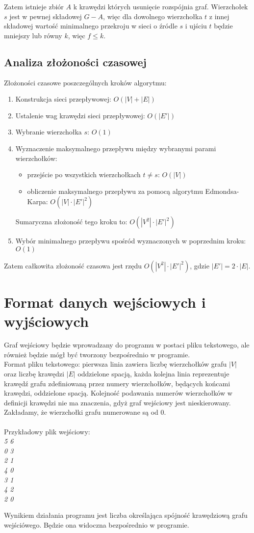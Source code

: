 \documentclass{article}
\begin{document}
Zatem istnieje zbiór $A$ k krawędzi których usunięcie rozspójnia graf. Wierzchołek $s$ jest w pewnej składowej $G-A$, więc dla dowolnego wierzchołka $t$ z innej składowej wartość minimalnego przekroju w sieci o źródle $s$ i ujściu $t$ będzie mniejszy lub równy $k$, więc $f \le k$.


\subsection{Analiza złożoności czasowej}


Złożoności czasowe poszczególnych kroków algorytmu: 
\begin{enumerate}
\item Konstrukcja sieci przepływowej: $O(|V|+|E|)$
\item Ustalenie wag krawędzi sieci przepływowej: $O(|E'|)$
\item Wybranie wierzchołka $s$: $O(1)$
\item Wyznaczenie maksymalnego przepływu między wybranymi parami wierzchołków: 
\begin{itemize}
    \item przejście po wszystkich wierzchołkach $t \neq s$: $O(|V|)$
    \item obliczenie maksymalnego przepływu za pomocą algorytmu Edmondsa-Karpa: $O(|V|\cdot|E'|^{2})$
\end{itemize}
Sumaryczna złożoność tego kroku to: $O(|V^{2}|\cdot|E'|^{2})$
\item Wybór minimalnego przepływu spośród wyznaczonych w poprzednim kroku: $O(1)$
\end{enumerate}
Zatem całkowita złożoność czasowa jest rzędu $O(|V^{2}|\cdot|E'|^{2})$, gdzie $|E'|=2\cdot |E|$.\\


\section{Format danych wejściowych i wyjściowych}
Graf wejściowy będzie wprowadzany do programu w postaci pliku tekstowego, ale również będzie mógł być tworzony bezpośrednio w programie.\\

Format pliku tekstowego: pierwsza linia zawiera liczbę wierzchołków grafu $|V|$ oraz liczbę krawędzi $|E|$ oddzielone spacją, każda kolejna linia reprezentuje krawędź grafu zdefiniowaną przez numery wierzchołków, będących końcami krawędzi, oddzielone spacją. Kolejność podawania numerów wierzchołków w definicji krawędzi nie ma znaczenia, gdyż graf wejściowy jest nieskierowany. Zakładamy, że wierzchołki grafu numerowane są od 0.
\\\\
Przykładowy plik wejściowy:\\
\textit{5 6\\
0 3\\
2 1\\
4 0\\
3 1\\
4 2\\
2 0\\
}


Wynikiem działania programu jest liczba określająca spójność krawędziową grafu wejściówego. Będzie ona widoczna bezpośrednio w programie.
\end{document}
